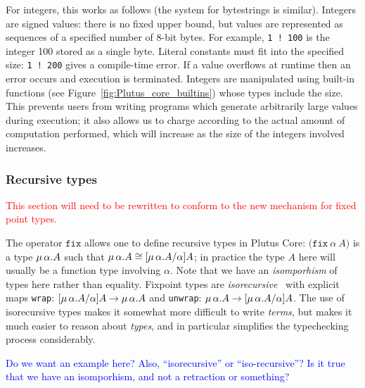\documentclass[a4paper]{article}
\newcommand{\red}[1]{\textcolor{red}{#1}}
\newcommand{\blue}[1]{\textcolor{blue}{#1}}
\newcommand{\keyword}[1]{\texttt{#1}}
\newcommand{\construct}[1]{\texttt{(} #1 \texttt{)}}
\newcommand{\fixT}[2]{\construct{\keyword{fix} ~ #1 ~ #2}}
\begin{document}
For integers, this works as follows (the system for 
bytestrings is similar).  Integers are signed values:
there is no fixed upper bound, but values are represented as sequences
of a specified number of 8-bit bytes.  For example, \texttt{1~!~100}
is the integer 100 stored as a single byte.  Literal constants must
fit into the specified size: \texttt{1~!~200} gives a compile-time
error. If a value overflows at runtime then an error occurs and
execution is terminated.  Integers are manipulated using built-in
functions (see Figure~\ref{fig:Plutus_core_builtins}) whose types
include the size. This prevents users from writing programs which
generate arbitrarily large values during execution; it also allows us
to charge according to the actual amount of computation performed,
which will increase as the size of the integers involved increases.


\subsubsection{Recursive types}
\red{This section will need to be rewritten to conform to the new
  mechanism for fixed point types.}

\noindent
The operator $\texttt{fix}$ allows one to
define recursive types in Plutus Core: $\fixT{\alpha}{A}$ is a type
$\mu\,\alpha.A$ such that $\mu\,\alpha.A \cong [\mu\,\alpha.A/\alpha]A$; in
practice the type $A$ here will usually be a function type involving
$\alpha$.  Note that we have an \textit{isomporhism} of types here
rather than equality.  Fixpoint types are
\textit{isorecursive}~\cite[20.2]{Pierce:TAPL} with explicit maps
\texttt{wrap}: $[\mu\,\alpha.A/\alpha]A \rightarrow \mu\,\alpha.A$ and
\texttt{unwrap}: $\mu\,\alpha.A \rightarrow [\mu\,\alpha.A/\alpha]A$.
The use of isorecursive types makes it somewhat more difficult to
write \textit{terms}, but makes it much easier to reason about
\textit{types}, and in particular simplifies the typechecking process
considerably.

\noindent\blue{Do we want an example here?  Also, ``isorecursive'' or ``iso-recursive''? 
Is it true that we have an isomporhism, and not a retraction or something?}

\end{document}

